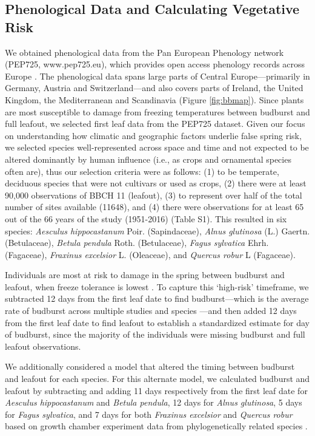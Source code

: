 \documentclass{article}\usepackage[]{graphicx}\usepackage[]{color}
\begin{document}
\subsection*{Phenological Data and Calculating Vegetative Risk}
We obtained phenological data from the Pan European Phenology network (PEP725, www.pep725.eu), which provides open access phenology records across Europe \citep{Templ2018}. The phenological data spans large parts of Central Europe---primarily in Germany, Austria and Switzerland---and also covers parts of Ireland, the United Kingdom, the Mediterranean and Scandinavia (Figure \ref{fig:bbmap}). Since plants are most susceptible to damage from freezing temperatures between budburst and full leafout, we selected first leaf data \citep[i.e., in][BBCH 11, which is defined as the point of leaf unfolding and the first visible leaf stalk]{Meier2001} from the PEP725 dataset. Given our focus on understanding how climatic and geographic factors underlie false spring risk, we selected species well-represented across space and time and not expected to be altered dominantly by human influence (i.e., as crops and ornamental species often are), thus our selection criteria were as follows: (1) to be temperate, deciduous species that were not cultivars or used as crops, (2) there were at least 90,000 observations of BBCH 11 (leafout), (3) to represent over half of the total number of sites available (11648), and (4) there were observations for at least 65 out of the 66 years of the study (1951-2016) (Table S1). This resulted in six species: \textit{Aesculus hippocastanum} Poir. (Sapindaceae), \textit{Alnus glutinosa} (L.) Gaertn. (Betulaceae), \textit{Betula pendula} Roth. (Betulaceae), \textit{Fagus sylvatica} Ehrh. (Fagaceae), \textit{Fraxinus excelsior} L. (Oleaceae), and \textit{Quercus robur} L (Fagaceae). 

Individuals are most at risk to damage in the spring between budburst and leafout, when freeze tolerance is lowest \citep{Sakai1987}. To capture this `high-risk' timeframe, we subtracted 12 days from the first leaf date to find budburst---which is the average rate of budburst across multiple studies and species \citep{Donnelly2017,Flynn2018,NPN2019}---and then added 12 days from the first leaf date to find leafout to establish a standardized estimate for day of budburst, since the majority of the individuals were missing budburst and full leafout observations. 

We additionally considered a model that altered the timing between budburst and leafout for each species. For this alternate model, we calculated budburst and leafout by subtracting and adding 11 days respectively from the first leaf date for \textit{Aesculus hippocastanum} and \textit{Betula pendula}, 12 days for \textit{Alnus glutinosa}, 5 days for \textit{Fagus sylvatica}, and 7 days for both \textit{Fraxinus excelsior} and \textit{Quercus robur} based on growth chamber experiment data from phylogenetically related species \citep[][ see supplemental materials `Supporting Information Methods S1: Species rate of budburst calculations' for more details]{Buerki2010,Wang2016,Hipp2017,Flynn2018}.
\end{document}
